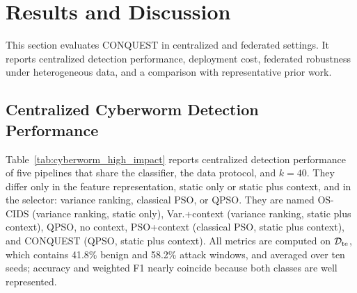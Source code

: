 \documentclass[conference]{IEEEtran}
\begin{document}
\section{\textbf{Results and Discussion}}
\label{sec:results_discussion}

This section evaluates CONQUEST in centralized and federated
settings. It reports centralized detection performance, deployment
cost, federated robustness under heterogeneous data, and a comparison
with representative prior work.

\subsection{Centralized Cyberworm Detection Performance}
\label{subsec:obj1_cyberworm_perf}

Table~\ref{tab:cyberworm_high_impact} reports centralized detection
performance of five pipelines that share the
classifier, the data protocol, and $k=40$. They differ only in the
feature representation, static only or static plus context, and in
the selector: variance ranking, classical PSO, or QPSO. They are named
OS-CIDS (variance ranking, static only), Var.+context (variance
ranking, static plus context), QPSO, no context, PSO+context
(classical PSO, static plus context), and CONQUEST (QPSO, static plus
context). All metrics
are computed on $\mathcal{D}_{\rm te}$, which contains 41.8\% benign
and 58.2\% attack windows, and averaged over ten seeds; accuracy and
weighted F1 nearly coincide because both classes are well
represented.
\end{document}
